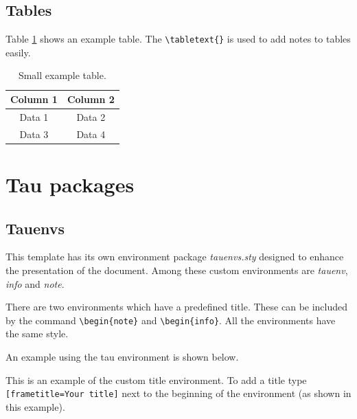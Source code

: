 \documentclass[9pt,a4paper,twoside]{tau-class/tau}
\begin{document}
    \subsection{Tables}
	
        Table \ref{tab:table} shows an example table. The \verb|\tabletext{}| is used to add notes to tables easily. 
		
	\begin{table}[H]
		\centering
		\caption{Small example table.}
		\label{tab:table}
		\begin{tabular}{cc}
			\toprule
			\textbf{Column 1} & \textbf{Column 2} \\
			\midrule
			Data 1 & Data 2 \\
			Data 3 & Data 4 \\
			\bottomrule
		\end{tabular}
			
			
	\end{table}
		
\section{Tau packages}

    \subsection{Tauenvs}
	
        This template has its own environment package \textit{tauenvs.sty} designed to enhance the presentation of the document. Among these custom environments are \textit{tauenv}, \textit{info} and \textit{note}.
		
        There are two environments which have a predefined title. These can be included by the command \verb|\begin{note}| and \verb|\begin{info}|. All the environments have the same style.
			
        An example using the tau environment is shown below.
		
	\begin{tauenv}[frametitle=Environment with custom title]
            This is an example of the custom title environment. To add a title type \verb|[frametitle=Your title]| next to the beginning of the environment (as shown in this example).
	\end{tauenv}
		
\end{document}
